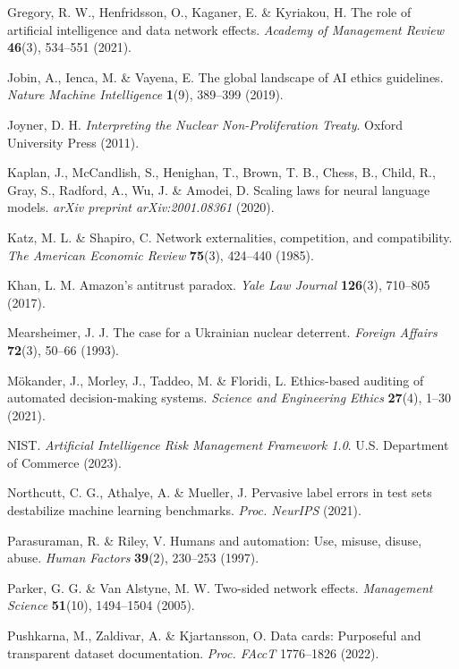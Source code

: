 \documentclass[12pt,a4paper]{ctexart}
\theoremstyle{definition}
\theoremstyle{remark}
\begin{document}
 Gregory, R. W., Henfridsson, O., Kaganer, E. \& Kyriakou, H. The role of artificial intelligence and data network effects. \textit{Academy of Management Review} \textbf{46}(3), 534--551 (2021).

 Jobin, A., Ienca, M. \& Vayena, E. The global landscape of AI ethics guidelines. \textit{Nature Machine Intelligence} \textbf{1}(9), 389--399 (2019).

 Joyner, D. H. \textit{Interpreting the Nuclear Non-Proliferation Treaty}. Oxford University Press (2011).

 Kaplan, J., McCandlish, S., Henighan, T., Brown, T. B., Chess, B., Child, R., Gray, S., Radford, A., Wu, J. \& Amodei, D. Scaling laws for neural language models. \textit{arXiv preprint arXiv:2001.08361} (2020).

 Katz, M. L. \& Shapiro, C. Network externalities, competition, and compatibility. \textit{The American Economic Review} \textbf{75}(3), 424--440 (1985).

 Khan, L. M. Amazon's antitrust paradox. \textit{Yale Law Journal} \textbf{126}(3), 710--805 (2017).

 Mearsheimer, J. J. The case for a Ukrainian nuclear deterrent. \textit{Foreign Affairs} \textbf{72}(3), 50--66 (1993).

 M\"{o}kander, J., Morley, J., Taddeo, M. \& Floridi, L. Ethics-based auditing of automated decision-making systems. \textit{Science and Engineering Ethics} \textbf{27}(4), 1--30 (2021).

 NIST. \textit{Artificial Intelligence Risk Management Framework 1.0}. U.S. Department of Commerce (2023).

 Northcutt, C. G., Athalye, A. \& Mueller, J. Pervasive label errors in test sets destabilize machine learning benchmarks. \textit{Proc. NeurIPS} (2021).

 Parasuraman, R. \& Riley, V. Humans and automation: Use, misuse, disuse, abuse. \textit{Human Factors} \textbf{39}(2), 230--253 (1997).

 Parker, G. G. \& Van Alstyne, M. W. Two-sided network effects. \textit{Management Science} \textbf{51}(10), 1494--1504 (2005).

 Pushkarna, M., Zaldivar, A. \& Kjartansson, O. Data cards: Purposeful and transparent dataset documentation. \textit{Proc. FAccT} 1776--1826 (2022).
\end{document}
